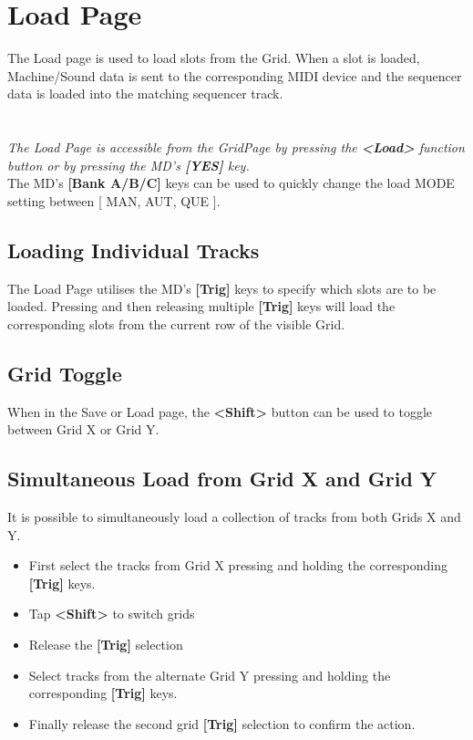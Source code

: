 \chapter{Load Page}
The Load page is used to load slots from the Grid. When a slot is loaded, Machine/Sound data is sent to the corresponding MIDI device and the sequencer data is loaded into the matching sequencer track.\\
\\
\\
\textit{The Load Page is accessible from the GridPage by pressing the  \textbf{<Load>} function button or by pressing the MD's \textbf{[YES]} key.}
\\
The MD's \textbf{[Bank A/B/C]} keys can be used to quickly change the load MODE setting between [ MAN, AUT, QUE ].
\newpage
\section{Loading Individual Tracks}
The Load Page utilises the MD's \textbf{[Trig]} keys to specify which slots are to be loaded. Pressing and then releasing multiple \textbf{[Trig]} keys will load the corresponding slots from the current row of the visible Grid.
\section{Grid Toggle}
When in the Save or Load page, the \textbf{<Shift>} button can be used to toggle between Grid X or Grid Y.
\section{Simultaneous Load from Grid X and Grid Y}
It is possible to simultaneously load a collection of tracks from both Grids X and Y. 
\begin{itemize}
\item First select the tracks from Grid X pressing and holding the corresponding \textbf{[Trig]} keys.
\item Tap \textbf{<Shift>} to switch grids
\item Release the \textbf{[Trig]} selection
\item Select tracks from the alternate Grid Y pressing and holding the corresponding \textbf{[Trig]} keys. 
\item Finally release the second grid \textbf{[Trig]} selection to confirm the action. 
\end{itemize}

